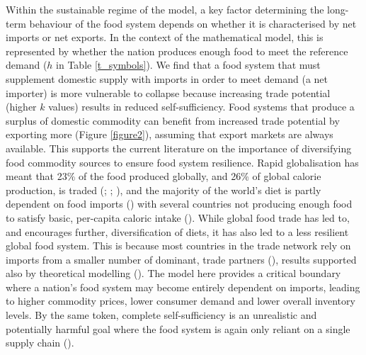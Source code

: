 \documentclass[12pt]{article}
\begin{document}
Within the sustainable regime of the model, a key factor determining the long-term behaviour of the food system depends on whether it is characterised by net imports or net exports. In the context of the mathematical model, this is represented by whether the nation produces enough food to meet the reference demand ($h$ in Table \ref{t_symbols}). We find that a food system that must supplement domestic supply with imports in order to meet demand (a net importer) is more vulnerable to collapse because increasing trade potential (higher $k$ values) results in reduced self-sufficiency. Food systems that produce a surplus of domestic commodity can benefit from increased trade potential by exporting more (Figure \ref{figure2}), assuming that export markets are always available. This supports the current literature on the importance of diversifying food commodity sources to ensure food system resilience. Rapid globalisation has meant that 23\% of the food produced globally, and 26\% of global calorie production, is traded (\cite{dodorico2014}; \cite{tu2019}; \cite{poppy2019}), and the majority of the world's diet is partly dependent on food imports (\cite{kummu2020}) with several countries not producing enough food to satisfy basic, per-capita caloric intake (\cite{dodorico2014}). While global food trade has led to, and encourages further, diversification of diets, it has also led to a less resilient global food system. This is because most countries in the trade network rely on imports from a smaller number of dominant, trade partners (\cite{kummu2020}), results supported also by theoretical modelling (\cite{tu2019}). The model here provides a critical boundary where a nation's food system may become entirely dependent on imports, leading to higher commodity prices, lower consumer demand and lower overall inventory levels. By the same token, complete self-sufficiency is an unrealistic and potentially harmful goal where the food system is again only reliant on a single supply chain (\cite{helm2017}).
\end{document}
